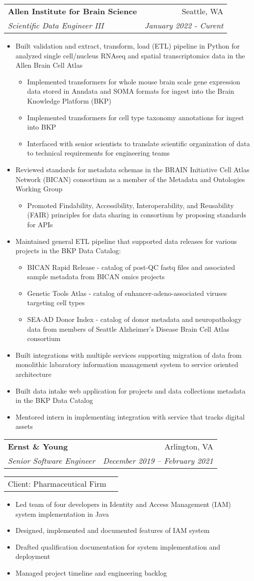 \documentclass[letterpaper,11pt]{article}
\makeatletter
\newcommand{\resumeItem}[1]{
  \item\small{
    {#1 \vspace{-2pt}}
  }
}
\newcommand{\resumeSubheading}[4]{
  \vspace{-1pt}\item
    \begin{tabular*}{0.97\textwidth}[t]{l@{\extracolsep{\fill}}r}
      \textbf{#1} & #2 \\
      \textit{\small#3} & \textit{\small #4} \\
    \end{tabular*}\vspace{-1pt}
}
\newcommand{\resumeSubSubheading}[1]{
    \begin{tabular*}{0.97\textwidth}{l@{\extracolsep{\fill}}r}
      {\small#1} \\
    \end{tabular*}\vspace{-4pt}
}
\newcommand{\resumeItemListStart}{\begin{itemize}}
\newcommand{\resumeItemListEnd}{\end{itemize}\vspace{-5pt}}
\makeatother
\begin{document}
    \resumeSubheading
      {Allen Institute for Brain Science}{Seattle, WA}
      {Scientific Data Engineer III}{January 2022 - Curent}
      \resumeItemListStart
        \resumeItem{Built validation and extract, transform, load (ETL) pipeline in Python for analyzed single cell/nucleus RNAseq and spatial transcriptomics data in the Allen Brain Cell Atlas}
          \resumeItemListStart
            \resumeItem{Implemented transformers for whole mouse brain scale gene expression data stored in Anndata and SOMA formats for ingest into the Brain Knowledge Platform (BKP)}
            \resumeItem{Implemented transformers for cell type taxonomy annotations for ingest into BKP}
            \resumeItem{Interfaced with senior scientists to translate scientific organization of data to technical requirements for engineering teams}
          \resumeItemListEnd
          \resumeItem{Reviewed standards for metadata schemas in the BRAIN Initiative Cell Atlas Network (BICAN) consortium as a member of the Metadata and Ontologies Working Group}
          \resumeItemListStart
            \resumeItem{Promoted Findability, Accessibility, Interoperability, and Reusability (FAIR) principles for data sharing in consortium by proposing standards for APIs}
          \resumeItemListEnd
          \resumeItem{Maintained general ETL pipeline that supported data releases for various projects in the BKP Data Catalog:}
            \resumeItemListStart
              \resumeItem{BICAN Rapid Release - catalog of post-QC fastq files and associated sample metadata from BICAN omics projects}
              \resumeItem{Genetic Tools Atlas - catalog of enhancer-adeno-associated viruses targeting cell types}
              \resumeItem{SEA-AD Donor Index - catalog of donor metadata and neuropathology data from members of Seattle Alzheimer's Disease Brain Cell Atlas consortium}
            \resumeItemListEnd
          \resumeItem{Built integrations with multiple services supporting migration of data from monolithic labaratory information management system to service oriented architecture}
        \resumeItem{Built data intake web application for projects and data collections metadata in the BKP Data Catalog}
        \resumeItem{Mentored intern in implementing integration with service that tracks digital assets}
      \resumeItemListEnd
    
    \resumeSubheading
      {Ernst \& Young}{Arlington, VA}
      {Senior Software Engineer}{December 2019 -- February 2021}
      \resumeSubSubheading
      {Client: Pharmaceutical Firm}
      \resumeItemListStart
        \resumeItem{Led team of four developers in Identity and Access Management (IAM) system implementation in Java}
        \resumeItem{Designed, implemented and documented features of IAM system}
        \resumeItem{Drafted qualification documentation for system implementation and deployment}
        \resumeItem{Managed project timeline and engineering backlog}
      \resumeItemListEnd
\end{document}
